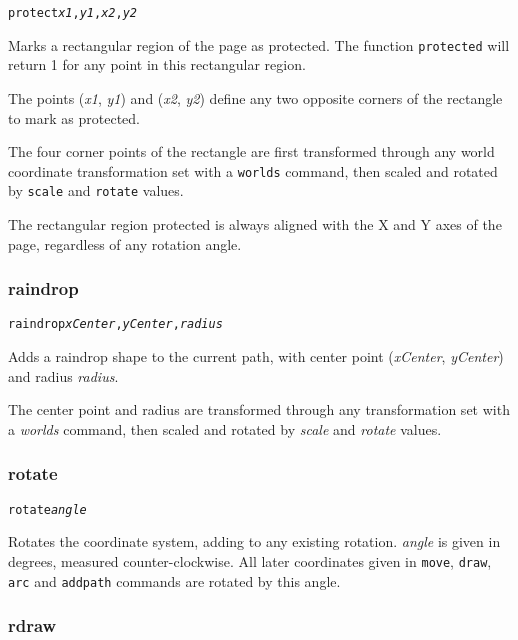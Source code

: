 \begin{alltt}
protect \textit{x1}, \textit{y1}, \textit{x2}, \textit{y2}
\end{alltt}

Marks a rectangular region of the page as protected.
The function \texttt{protected} will return 1 for any
point in this rectangular region.

The points
(\textit{x1}, \textit{y1}) and (\textit{x2}, \textit{y2}) define
any two opposite corners of the rectangle to mark as protected.

The four corner points of the rectangle
are first transformed through any world coordinate
transformation set with a \texttt{worlds} command,
then scaled and rotated by \texttt{scale}
and \texttt{rotate} values.

The rectangular region protected is always aligned with the X
and Y axes of the page, regardless of any rotation angle.

\subsubsection{raindrop}

\begin{alltt}
raindrop \textit{xCenter}, \textit{yCenter}, \textit{radius}
\end{alltt}

Adds a raindrop shape to the current path, with center
point (\textit{xCenter}, \textit{yCenter}) and radius
\textit{radius}.

The center point and radius are transformed through any
transformation set with a \textit{worlds} command,
then scaled and rotated by \textit{scale}
and \textit{rotate} values.

\subsubsection{rotate}

\begin{alltt}
rotate \textit{angle}
\end{alltt}

Rotates the coordinate system, adding to any existing rotation.  \textit{angle}
is given in degrees, measured counter-clockwise.  All later coordinates given
in \texttt{move}, \texttt{draw}, \texttt{arc} and \texttt{addpath} commands are
rotated by this angle.

\subsubsection{rdraw}


